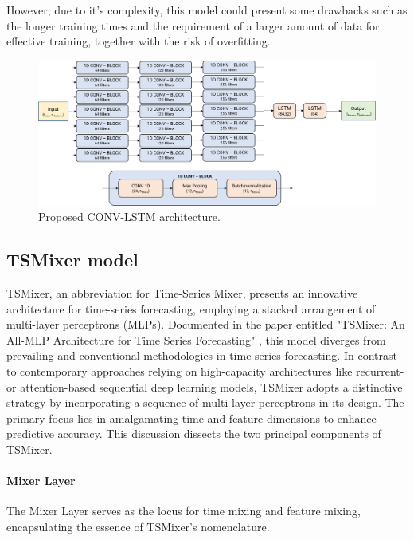 However, due to it's complexity, this model could present some drawbacks such as the longer training times and the requirement of a larger amount of data for effective training, together with the risk of overfitting.


\begin{figure}
    \centering
    \includegraphics[width=1\linewidth]{images/model architectures/convlstm_model.png}
    \caption{Proposed CONV-LSTM architecture.}
    \label{fig:convlstm_model}
\end{figure}

\subsection{TSMixer model}

TSMixer, an abbreviation for Time-Series Mixer, presents an innovative architecture for time-series forecasting, employing a stacked arrangement of multi-layer perceptrons (MLPs). Documented in the paper entitled "TSMixer: An All-MLP Architecture for Time Series Forecasting" \cite{chen2023tsmixer}, this model diverges from prevailing and conventional methodologies in time-series forecasting. In contrast to contemporary approaches relying on high-capacity architectures like recurrent- or attention-based sequential deep learning models, TSMixer adopts a distinctive strategy by incorporating a sequence of multi-layer perceptrons in its design. The primary focus lies in amalgamating time and feature dimensions to enhance predictive accuracy. This discussion dissects the two principal components of TSMixer.

\paragraph{Mixer Layer}

The Mixer Layer serves as the locus for time mixing and feature mixing, encapsulating the essence of TSMixer's nomenclature.

